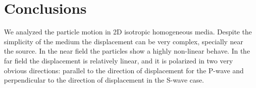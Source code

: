 \section{Conclusions}
We analyzed the particle motion in 2D isotropic homogeneous media. Despite the simplicity
of the medium the displacement can be very complex, specially near the source. In the near
field the particles show a highly non-linear behave. In the far field the displacement
is relatively linear, and it is polarized in two very obvious directions: parallel to the 
direction of displacement for the P-wave and perpendicular to the direction of displacement
in the S-wave case.
